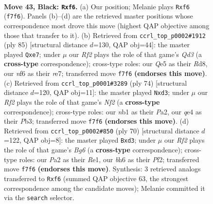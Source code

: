 \documentclass[11pt]{article}
\begin{document}
\clearpage

\begin{figure}[p]\centering
\begin{subfigure}{0.46\textwidth}\centering
\resizebox{\linewidth}{!}{%
\newchessgame
\chessboard[
  setfen={2b1k3/p2n1r1p/1P3N1B/4qP2/1p1pQ3/8/p3P3/1N1K2R1 b - - 0 43},
  showmover=false,
  pgfstyle=straightmove, color=movearrow, markmove={f7-f6}
]}
\caption{}
\end{subfigure}\hfill
\begin{subfigure}{0.46\textwidth}\centering
\resizebox{\linewidth}{!}{%
\newchessgame
\chessboard[
  setfen={3r4/3kR1p1/3q3p/1b1p1p2/p2B4/1r1P2N1/1PQ4K/2R5 b - - 0 43},
  showmover=false,
  pgfstyle=straightmove, color=movearrow, markmove={d6-e7}
]}
\caption{}
\end{subfigure}
\\[4pt]
\begin{subfigure}{0.46\textwidth}\centering
\resizebox{\linewidth}{!}{%
\newchessgame
\chessboard[
  setfen={6k1/3rb1p1/pB4q1/4pp2/2P3P1/1P1n4/P3QN1P/5RK1 w - - 0 38},
  showmover=false,
  pgfstyle=straightmove, color=movearrow, markmove={f2-d3}
]}
\caption{}
\end{subfigure}\hfill
\begin{subfigure}{0.46\textwidth}\centering
\resizebox{\linewidth}{!}{%
\newchessgame
\chessboard[
  setfen={1q5k/6rp/p3ppB1/P7/bPpN3Q/3n4/5PP1/4R1K1 w - - 8 36},
  showmover=false,
  pgfstyle=straightmove, color=movearrow, markmove={g6-d3}
]}
\caption{}
\end{subfigure}
\caption{\textbf{Move 43, Black: \texttt{Rxf6}.} (a) Our position; Melanie plays \texttt{Rxf6} (\texttt{f7f6}). Panels (b)--(d) are the retrieved master positions whose correspondence most drove this move (highest QAP objective among those that transfer to it). (b) Retrieved from \texttt{ccrl\_top\_p0002\#1912} (ply 85) [structural distance $d$=130, QAP obj=44]: the master played \texttt{Qxe7}; under $\mu$ our \emph{Rf2} plays the role of that game's \emph{Qd3} (a \textbf{cross-type} correspondence); cross-type roles: our \emph{Q}e5 as their \emph{R}d8, our \emph{n}f6 as their \emph{r}e7; transferred move \texttt{f7f6} \textbf{(endorses this move)}. (c) Retrieved from \texttt{ccrl\_top\_p0001\#3289} (ply 74) [structural distance $d$=120, QAP obj=11]: the master played \texttt{Nxd3}; under $\mu$ our \emph{Rf2} plays the role of that game's \emph{Nf2} (a \textbf{cross-type} correspondence); cross-type roles: our \emph{n}b1 as their \emph{P}a2, our \emph{q}e4 as their \emph{P}b3; transferred move \texttt{f7f6} \textbf{(endorses this move)}. (d) Retrieved from \texttt{ccrl\_top\_p0002\#850} (ply 70) [structural distance $d$=122, QAP obj=8]: the master played \texttt{Bxd3}; under $\mu$ our \emph{Rf2} plays the role of that game's \emph{Bg6} (a \textbf{cross-type} correspondence); cross-type roles: our \emph{P}a2 as their \emph{R}e1, our \emph{b}h6 as their \emph{P}f2; transferred move \texttt{f7f6} \textbf{(endorses this move)}. Synthesis: 3 retrieved analogs transferred to \texttt{Rxf6} (summed QAP objective 63, the strongest correspondence among the candidate moves); Melanie committed it via the \texttt{search} selector.}
\label{fig:thought-m85}
\end{figure}
\end{document}
